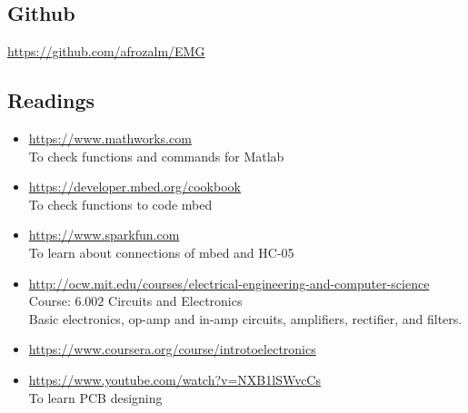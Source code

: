 \documentclass{article}
\begin{document}
\subsection{Github}
\url{https://github.com/afrozalm/EMG}
\subsection{Readings}
\begin{itemize}
\item \url{https://www.mathworks.com}
\\
To check functions and commands for Matlab
\item \url{https://developer.mbed.org/cookbook}
\\
To check functions to code mbed
\item \url{https://www.sparkfun.com}
\\
To learn about connections of mbed and HC-05
\item \url{http://ocw.mit.edu/courses/electrical-engineering-and-computer-science}
\\
Course: $6.002$ Circuits and Electronics
\\
Basic electronics, op-amp and in-amp circuits, amplifiers, rectifier, and filters.
\item \url{https://www.coursera.org/course/introtoelectronics}
\item \url{https://www.youtube.com/watch?v=NXB1lSWvcCs}
\\
To learn PCB designing

\end{itemize}
\end{document}
